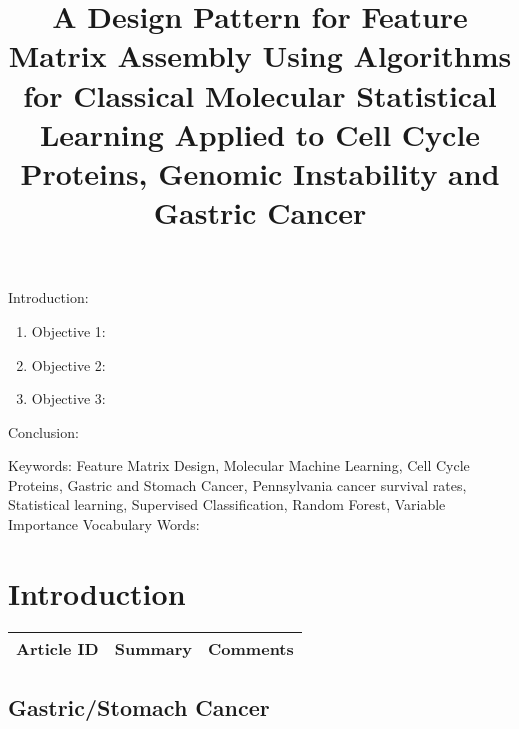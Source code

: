 
\twocolumn
\scriptsize
\begin{frontmatter}
		\title{A Design Pattern for Feature Matrix Assembly Using Algorithms for Classical Molecular Statistical Learning Applied to Cell Cycle Proteins, Genomic Instability and Gastric Cancer }
		\author{}
		\address{The Mathematical Learning Space}
\end{frontmatter}	

Introduction:
\begin{enumerate}
\item Objective 1:
\item Objective 2:
\item Objective 3:
\end{enumerate}
Conclusion:

Keywords: Feature Matrix Design, Molecular Machine Learning, Cell Cycle Proteins, Gastric and Stomach Cancer, Pennsylvania cancer survival rates, Statistical learning, Supervised Classification, Random Forest, Variable Importance 
Vocabulary Words:

\section{Introduction}

\begin{table}[H]\centering
	\begin{tabular}{p{1cm}p{4cm}p{3cm}}
		Article ID & Summary & Comments\\
		\hline
		\hline
	\end{tabular}
\end{table}


\subsection{Gastric/Stomach Cancer}

